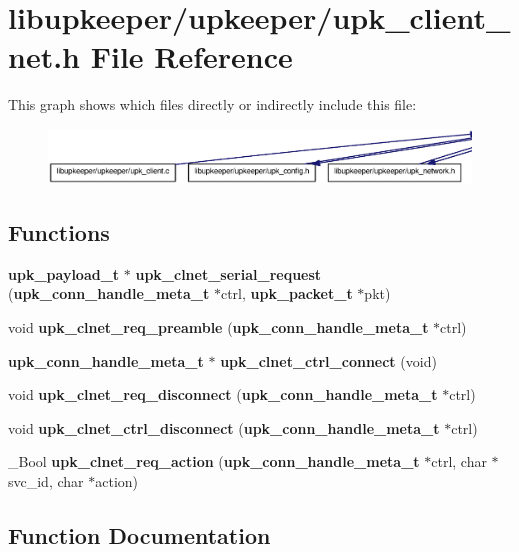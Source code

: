 \section{libupkeeper/upkeeper/upk\_\-client\_\-net.h File Reference}
\label{upk__client__net_8h}
This graph shows which files directly or indirectly include this file:\nopagebreak
\begin{figure}[H]
\begin{center}
\leavevmode
\includegraphics[width=400pt]{upk__client__net_8h__dep__incl}
\end{center}
\end{figure}
\subsection*{Functions}
\begin{DoxyCompactItemize}
\item 
{\bf upk\_\-payload\_\-t} $\ast$ {\bf upk\_\-clnet\_\-serial\_\-request} ({\bf upk\_\-conn\_\-handle\_\-meta\_\-t} $\ast$ctrl, {\bf upk\_\-packet\_\-t} $\ast$pkt)
\item 
void {\bf upk\_\-clnet\_\-req\_\-preamble} ({\bf upk\_\-conn\_\-handle\_\-meta\_\-t} $\ast$ctrl)
\item 
{\bf upk\_\-conn\_\-handle\_\-meta\_\-t} $\ast$ {\bf upk\_\-clnet\_\-ctrl\_\-connect} (void)
\item 
void {\bf upk\_\-clnet\_\-req\_\-disconnect} ({\bf upk\_\-conn\_\-handle\_\-meta\_\-t} $\ast$ctrl)
\item 
void {\bf upk\_\-clnet\_\-ctrl\_\-disconnect} ({\bf upk\_\-conn\_\-handle\_\-meta\_\-t} $\ast$ctrl)
\item 
\_\-Bool {\bf upk\_\-clnet\_\-req\_\-action} ({\bf upk\_\-conn\_\-handle\_\-meta\_\-t} $\ast$ctrl, char $\ast$svc\_\-id, char $\ast$action)
\end{DoxyCompactItemize}


\subsection{Function Documentation}
